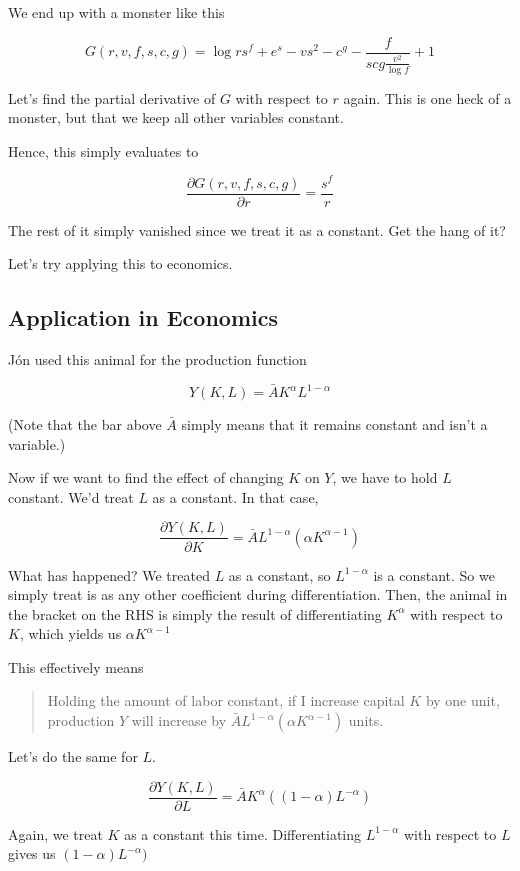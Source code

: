\documentclass[11pt]{scrartcl}
\newcommand{\jon}{Jón }
\begin{document}
We end up with a monster like this

\[ G(r,v,f,s,c,g) = \log{r}s^f + e^{s} - vs^2 - c^g - \frac{f}{scg \frac{v^2}{\log{f}}}+ 1 \]

Let's find the partial derivative of $G$ with respect to $r$ again. This is one heck of a monster, but that we keep all other variables constant. 

Hence, this simply evaluates to

\[ \frac{\partial G(r,v,f,s,c,g)}{\partial r} = \frac{s^f}{r} \]

The rest of it simply vanished since we treat it as a constant. Get the hang of it?

Let's try applying this to economics. 

\subsection{Application in Economics}
\jon used this animal for the production function

\[ Y(K,L) = \bar{A}K^{\alpha}L^{1 - \alpha} \]

(Note that the bar above $\bar{A}$ simply means that it remains constant and isn't a variable.)

Now if we want to find the effect of changing $K$ on $Y$, we have to hold $L$ constant. We'd treat $L$ as a constant. In that case,

\[ \frac{\partial Y(K,L)}{\partial K} = \bar{A} L^{1 - \alpha} (\alpha K^{\alpha-1}) \]

What has happened? We treated $L$ as a constant, so $L^{1-\alpha}$ is a constant. So we simply treat is as any other coefficient during differentiation. Then, the animal in the bracket on the RHS is simply the result of differentiating $K^{\alpha}$ with respect to $K$, which yields us $\alpha K^{\alpha - 1}$

This effectively means

\begin{quote}
Holding the amount of labor constant, if I increase capital $K$ by one unit, production $Y$ will increase by $\bar{A} L^{1 - \alpha} (\alpha K^{\alpha-1})$ units.
\end{quote}

Let's do the same for $L$. 

\[ \frac{\partial Y(K,L)}{\partial L} = \bar{A}K^{\alpha}((1-\alpha)L^{-\alpha}) \] 

Again, we treat $K$ as a constant this time. Differentiating $L^{1-\alpha}$ with respect to $L$ gives us $(1-\alpha)L^{-\alpha})$
\end{document}
